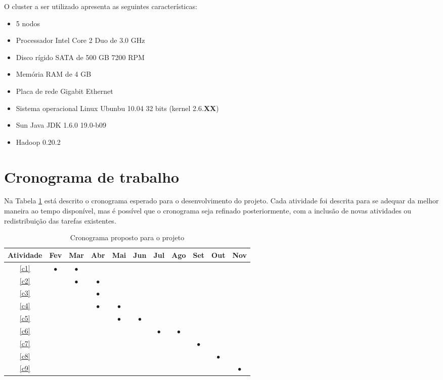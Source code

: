O cluster a ser utilizado apresenta as seguintes características:
\begin{itemize}
\item 5 nodos
\item Processador Intel Core 2 Duo de 3.0 GHz
\item Disco rígido SATA de 500 GB 7200 RPM
\item Memória RAM de 4 GB
\item Placa de rede Gigabit Ethernet
\item Sistema operacional Linux Ubunbu 10.04 32 bits (kernel 2.6.\textbf{XX})
\item Sun Java JDK 1.6.0 19.0-b09 
\item Hadoop 0.20.2
\end{itemize}

\section{Cronograma de trabalho}

Na Tabela \ref{tab:cronograma} está descrito o cronograma esperado para o desenvolvimento do projeto. Cada atividade foi descrita para se adequar da melhor maneira ao tempo disponível, mas é possível que o cronograma seja refinado posteriormente, com a inclusão de novas atividades ou redistribuição das tarefas existentes. 

\begin{table}[h]

\renewcommand{\arraystretch}{1}
\setlength\tabcolsep{3pt}
\begin{center}
\begin{tabular}{| c | c | c | c | c | c | c | c | c | c | c |}
\hline

Atividade &Fev &Mar &Abr &Mai &Jun &Jul &Ago &Set &Out &Nov \\ \hline \hline
\ref{c1}   &$\bullet$ &$\bullet$ & & & & & & & & \\ \hline
\ref{c2}   & &$\bullet$ &$\bullet$ & & & & & & & \\ \hline
\ref{c3}   & & &$\bullet$ & & & & & & & \\ \hline
\ref{c4}   & & &$\bullet$ &$\bullet$ & & & & & & \\ \hline
\ref{c5}   & & & &$\bullet$ &$\bullet$ & & & & & \\ \hline
\ref{c6}   & & & & & &$\bullet$ &$\bullet$ & & & \\ \hline
\ref{c7}   & & & & & & & &$\bullet$ & & \\ \hline
\ref{c8}   & & & & & & & & &$\bullet$ & \\ \hline
\ref{c9}   & & & & & & & & & &$\bullet$ \\ 
\hline
\end{tabular}
\end{center}
\caption{Cronograma proposto para o projeto}
\label{tab:cronograma}
\end{table}

